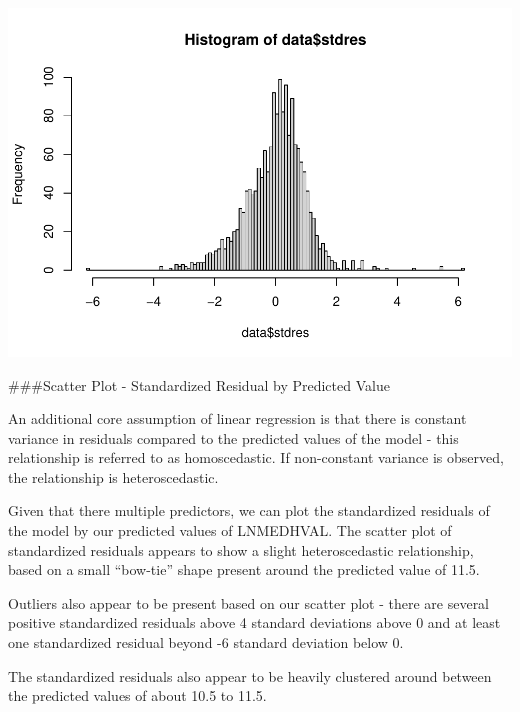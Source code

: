 \documentclass[
]{article}
\newenvironment{Shaded}{\begin{snugshade}}{\end{snugshade}}
\newcommand{\AttributeTok}[1]{\textcolor[rgb]{0.13,0.29,0.53}{#1}}
\newcommand{\FunctionTok}[1]{\textcolor[rgb]{0.13,0.29,0.53}{\textbf{#1}}}
\newcommand{\NormalTok}[1]{#1}
\newcommand{\SpecialCharTok}[1]{\textcolor[rgb]{0.81,0.36,0.00}{\textbf{#1}}}
\newcommand{\StringTok}[1]{\textcolor[rgb]{0.31,0.60,0.02}{#1}}
\begin{document}
\includegraphics{HW1-Regression_files/figure-latex/resid plot-1.pdf}

\#\#\#Scatter Plot - Standardized Residual by Predicted Value

An additional core assumption of linear regression is that there is
constant variance in residuals compared to the predicted values of the
model - this relationship is referred to as homoscedastic. If
non-constant variance is observed, the relationship is heteroscedastic.

Given that there multiple predictors, we can plot the standardized
residuals of the model by our predicted values of LNMEDHVAL. The scatter
plot of standardized residuals appears to show a slight heteroscedastic
relationship, based on a small ``bow-tie'' shape present around the
predicted value of 11.5.

Outliers also appear to be present based on our scatter plot - there are
several positive standardized residuals above 4 standard deviations
above 0 and at least one standardized residual beyond -6 standard
deviation below 0.

The standardized residuals also appear to be heavily clustered around
between the predicted values of about 10.5 to 11.5.

\begin{Shaded}
\end{Shaded}
\end{document}
